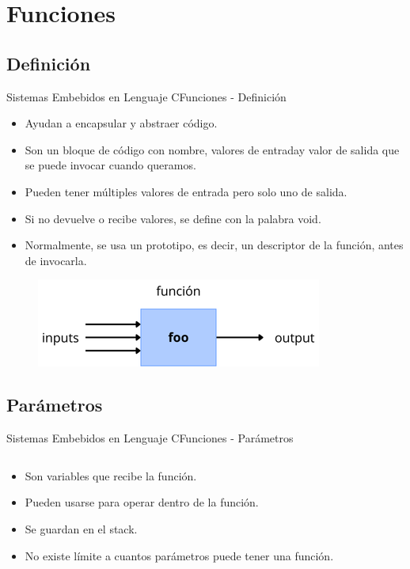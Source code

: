 \documentclass[aspectratio=169, xcolor=dvipsnames]{beamer}
\begin{document}
\section{Funciones}
\subsection{Definición}
\begin{frame}{Sistemas Embebidos en Lenguaje C}{Funciones - Definición}
\begin{itemize}
    \item Ayudan a encapsular y abstraer código.
    \item Son un bloque de código con nombre, valores de entraday  valor de salida que se puede invocar cuando queramos.
    \item Pueden tener múltiples valores de entrada pero solo uno de salida.
    \item Si no devuelve o recibe valores, se define con la palabra \textcolor{myblue}{void}.
    \item Normalmente, se usa un prototipo, es decir, un descriptor de la función, antes de invocarla.
\end{itemize}
\begin{figure}
    \centering
    \includegraphics[width=0.5\linewidth]{resources/images/funciones.png}
\end{figure}
\end{frame}

\subsection{Parámetros}
\begin{frame}{Sistemas Embebidos en Lenguaje C}{Funciones - Parámetros}
\begin{columns}
    \begin{column}{0.5\textwidth}
    \begin{itemize}
        \item Son variables que recibe la función.
        \item Pueden usarse para operar dentro de la función.
        \item Se guardan en el stack.
        \item No existe límite a cuantos parámetros puede tener una función.
    \end{itemize}
    
    \end{column}
    \begin{column}{0.5\textwidth}
    
    \end{column}
\end{columns}
\end{frame}
\end{document}
